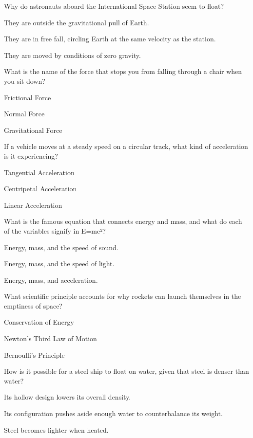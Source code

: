 
\begin{enhancedmcq}{Why do astronauts aboard the International Space Station seem to float?}
\item They are outside the gravitational pull of Earth.
\item They are in free fall, circling Earth at the same velocity as the station.
\item They are moved by conditions of zero gravity.

\end{enhancedmcq}
\begin{enhancedmcq}{What is the name of the force that stops you from falling through a chair when you sit down?}
\item Frictional Force
\item Normal Force
\item Gravitational Force

\end{enhancedmcq}
\begin{enhancedmcq}{If a vehicle moves at a steady speed on a circular track, what kind of acceleration is it experiencing?}
\item Tangential Acceleration
\item Centripetal Acceleration
\item Linear Acceleration

\end{enhancedmcq}
\begin{enhancedmcq}{What is the famous equation that connects energy and mass, and what do each of the variables signify in E=mc²?}
\item Energy, mass, and the speed of sound.
\item Energy, mass, and the speed of light.
\item Energy, mass, and acceleration.

\end{enhancedmcq}
\begin{enhancedmcq}{What scientific principle accounts for why rockets can launch themselves in the emptiness of space?}
\item Conservation of Energy
\item Newton's Third Law of Motion
\item Bernoulli's Principle

\end{enhancedmcq}
\begin{enhancedmcq}{How is it possible for a steel ship to float on water, given that steel is denser than water?}
\item Its hollow design lowers its overall density.
\item Its configuration pushes aside enough water to counterbalance its weight.
\item Steel becomes lighter when heated.

\end{enhancedmcq}
